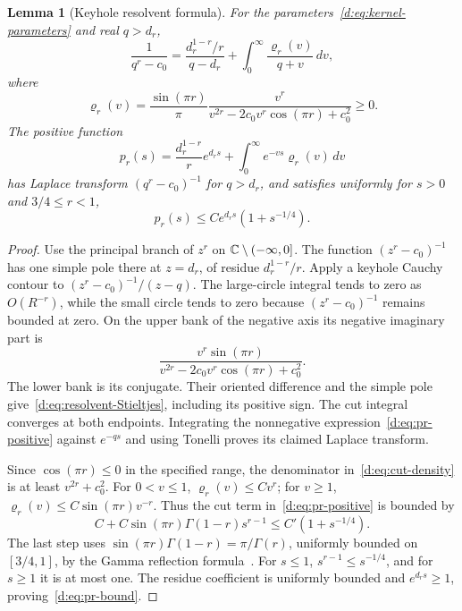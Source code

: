 \documentclass[11pt,a4paper]{article}
\numberwithin{equation}{section}
\newtheorem{lemma}[theorem]{Lemma}
\theoremstyle{definition}\newtheorem{definition}[theorem]{Definition}
\theoremstyle{remark}\newtheorem{remark}[theorem]{Remark}
\begin{document}
\begin{lemma}[Keyhole resolvent formula]\label{d:lem:keyhole}
For the parameters~\eqref{d:eq:kernel-parameters} and real $q>d_r$,
\begin{equation}\label{d:eq:resolvent-Stieltjes}
 \frac1{q^r-c_0}
 =\frac{d_r^{1-r}/r}{q-d_r}
   +\int_0^\infty\frac{\varrho_r(v)}{q+v}\,dv,
\end{equation}
where
\begin{equation}\label{d:eq:cut-density}
 \varrho_r(v)=\frac{\sin(\pi r)}{\pi}
 \frac{v^r}{v^{2r}-2c_0v^r\cos(\pi r)+c_0^2}\ge0.
\end{equation}
The positive function
\begin{equation}\label{d:eq:pr-positive}
 p_r(s)=\frac{d_r^{1-r}}r e^{d_rs}
             +\int_0^\infty e^{-vs}\varrho_r(v)\,dv
\end{equation}
has Laplace transform $(q^r-c_0)^{-1}$ for $q>d_r$, and satisfies uniformly for $s>0$ and $3/4\le r<1$,
\begin{equation}\label{d:eq:pr-bound}
 p_r(s)\le C e^{d_rs}(1+s^{-1/4}).
\end{equation}
\end{lemma}
\begin{proof}
Use the principal branch of $z^r$ on $\mathbb C\setminus(-\infty,0]$. The function $(z^r-c_0)^{-1}$ has one simple pole there at $z=d_r$, of residue $d_r^{1-r}/r$. Apply a keyhole Cauchy contour to
$(z^r-c_0)^{-1}/(z-q)$. The large-circle integral tends to zero as $O(R^{-r})$, while the small circle tends to zero because $(z^r-c_0)^{-1}$ remains bounded at zero. On the upper bank of the negative axis its negative imaginary part is
\[
 \frac{v^r\sin(\pi r)}
 {v^{2r}-2c_0v^r\cos(\pi r)+c_0^2}.
\]
The lower bank is its conjugate. Their oriented difference and the simple pole give~\eqref{d:eq:resolvent-Stieltjes}, including its positive sign. The cut integral converges at both endpoints. Integrating the nonnegative expression~\eqref{d:eq:pr-positive} against $e^{-qs}$ and using Tonelli proves its claimed Laplace transform.

Since $\cos(\pi r)\le0$ in the specified range, the denominator in~\eqref{d:eq:cut-density} is at least $v^{2r}+c_0^2$. For $0<v\le1$, $\varrho_r(v)\le C v^r$; for $v\ge1$,
$\varrho_r(v)\le C\sin(\pi r)v^{-r}$. Thus the cut term in~\eqref{d:eq:pr-positive} is bounded by
\[
 C+C\sin(\pi r)\Gamma(1-r)s^{r-1}
 \le C'(1+s^{-1/4}).
\]
The last step uses
$\sin(\pi r)\Gamma(1-r)=\pi/\Gamma(r)$, uniformly bounded on $[3/4,1]$, by the Gamma reflection formula~\cite[Eq.~5.5.3]{DLMF}. For $s\le1$, $s^{r-1}\le s^{-1/4}$, and for $s\ge1$ it is at most one. The residue coefficient is uniformly bounded and $e^{d_rs}\ge1$, proving~\eqref{d:eq:pr-bound}.
\end{proof}
\end{document}
